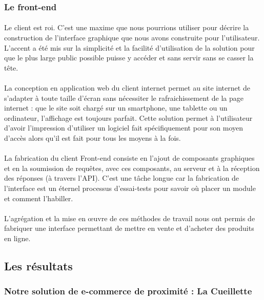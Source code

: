 \documentclass[a4paper, 12pt]{article}
\begin{document}
\subsubsection{Le front-end}

\paragraph{}Le client est roi. C’est une maxime que nous pourrions utiliser pour décrire la construction de l’interface graphique que nous avons construite pour l’utilisateur. L’accent a été mis sur la simplicité et la facilité d’utilisation de la solution pour que le plus large public possible puisse y accéder et sans servir sans se casser la tête.
\paragraph{}La conception en application web du client internet permet au site internet de s’adapter à toute taille d’écran sans nécessiter le rafraichissement de la page internet : que le site soit chargé sur un smartphone, une tablette ou un ordinateur, l’affichage est toujours parfait. Cette solution permet à l’utilisateur d’avoir l’impression d’utiliser un logiciel fait spécifiquement pour son moyen d’accès alors qu’il est fait pour tous les moyens à la fois.
\paragraph{}La fabrication du client Front-end consiste en l’ajout de composants graphiques et en la soumission de requêtes, avec ces composants, au serveur et à la réception des réponses (à travers l’API). C’est une tâche longue car la fabrication de l’interface est un éternel processus d’essai-tests pour savoir où placer un module et comment l’habiller.
\paragraph{}L’agrégation et la mise en œuvre de ces méthodes de travail nous ont permis de fabriquer une interface permettant de mettre en vente et d’acheter des produits en ligne.

\subsection{Les résultats}
\subsubsection{Notre solution de e-commerce de proximité : La Cueillette}
\end{document}

